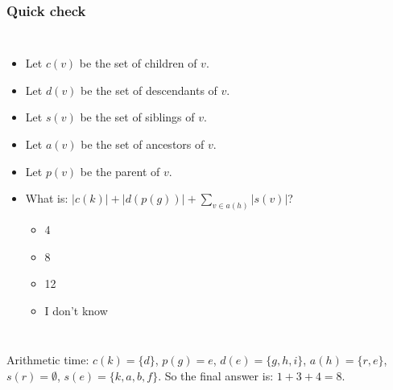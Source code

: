 \begin{frame}
	\frametitle{Quick check}
	
	\begin{columns}[T]
		
			\begin{itemize}
				\item Let $c(v)$ be the set of children of $v$.
				\item Let $d(v)$ be the set of descendants of $v$.
				\item Let $s(v)$ be the set of siblings of $v$.
				\item Let $a(v)$ be the set of ancestors of $v$.
				\item Let $p(v)$ be the parent of $v$.
				\item What is: $|c(k)| + |d(p(g))| + \sum\limits_{v \in a(h)} |s(v)|$?
				\begin{itemize}
					\item 4
					\item 8
					\item 12
					\item I don't know
				\end{itemize}
			\end{itemize}
	\end{columns}
	
Arithmetic time:
		$c(k) = \{d\}$, $p(g) = e$, $d(e) = \{g,h,i\}$, $a(h) = \{r,e\}$, $s(r) = \emptyset$, $s(e) = \{k,a,b,f\}$. So the
		final answer is: $1+3+4=8$.
\end{frame}


